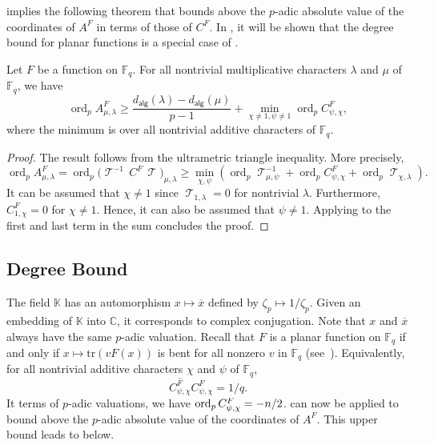 \documentclass[12pt]{article}
\newcommand{\F}{\mathbb{F}}
\newcommand{\CC}{\mathbb{C}}
\newcommand{\K}{\mathbb{K}}
\newcommand{\tr}{\mathrm{tr}}
\DeclareMathOperator{\ord}{ord}
\DeclareMathOperator{\TT}{\mathscr{T}}
\newcommand{\adeg}[1]{d_{\mathsf{alg}}(#1)}
\begin{document}
 implies the following theorem that bounds above the $p$-adic absolute value of the coordinates of $A^F$ in terms of those of $C^F$.
In , it will be shown that the degree bound for planar functions is a special case of .

\begin{lemma} \label{lem:baseConversionBound}
Let $F$ be a function on $\F_q$. For all nontrivial multiplicative characters $\lambda$ and $\mu$ of $\F_q$, we have
\begin{equation*}
\ord_p A^F_{\mu, \lambda} \ge \frac{\adeg{\lambda} - \adeg{\mu}}{p - 1} + \min_{\chi \neq 1, \psi \neq 1} \ord_p C^F_{\psi, \chi},
\end{equation*}
where the minimum is over all nontrivial additive characters of $\F_q$.
\end{lemma}
\begin{proof}
The result follows from the ultrametric triangle inequality. More precisely,
\begin{equation*}
\ord_p A^F_{\mu, \lambda} = \ord_p \big(\TT^{-1}\,C^F\,\TT\big)_{\mu, \lambda}\ge \min_{\chi, \psi}\left( \ord_p \TT^{-1}_{\mu, \psi} + \ord_p C^F_{\psi, \chi} + \ord_p \TT_{\chi, \lambda}\right).
\end{equation*}
It can be assumed that $\chi \neq 1$ since $\TT_{1, \lambda} = 0$ for nontrivial $\lambda$.
Furthermore, $C^F_{1, \chi} = 0$ for $\chi \neq 1$. Hence, it can also be assumed that $\psi \neq 1$.
Applying  to the first and last term in the sum concludes the proof.
\end{proof}

\subsection{Degree Bound} \label{subsec:degreeBound}
The field $\K$ has an automorphism $x \mapsto \overline{x}$ defined by $\zeta_p \mapsto 1/\zeta_p$. Given an embedding of $\K$ into $\CC$, it corresponds to complex conjugation.
Note that $x$ and $\overline x$ always have the same $p$-adic valuation.
Recall that $F$ is a planar function on $\F_q$ if and only if $x \mapsto \tr(vF(x))$ is bent for all nonzero $v$ in $\F_q$ (see~\cite{carlet2001generalized,DBLP:journals/dcc/Pott16}).
Equivalently, for all nontrivial additive characters $\chi$ and $\psi$ of $\F_q$,
\begin{equation*}
\overline{C^F_{\psi, \chi}} C^F_{\psi, \chi} = 1/q.
\end{equation*}
It terms of $p$-adic valuations, we have $\ord_p \smash{C^F_{\psi, \chi}} = -n/2$.  can now be applied to bound above the $p$-adic absolute value of the coordinates of $A^F$.
This upper bound leads to  below.
\end{document}
